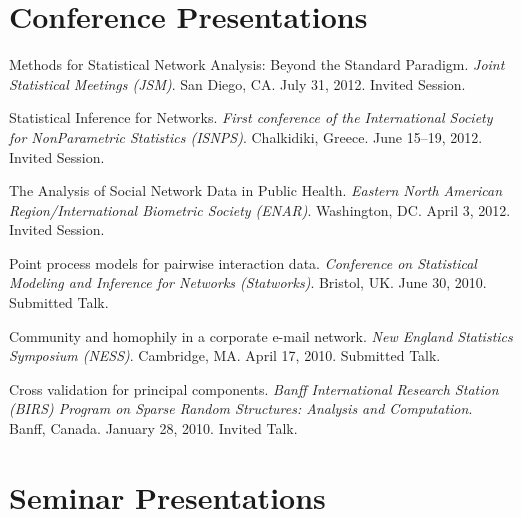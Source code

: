 \documentclass[10pt,letterpaper]{article}
\renewenvironment{itemize}{
  \begin{list}{}{
    \setlength{\leftmargin}{1.5em}
    \setlength{\itemsep}{0.25em}
    \setlength{\parskip}{0pt}
    \setlength{\parsep}{0.25em}
  }
}{
  \end{list}
}
\begin{document}
\section*{Conference Presentations}
\begin{itemize}
\item Methods for Statistical Network Analysis: Beyond the Standard Paradigm.
  \textit{Joint Statistical Meetings (JSM)}.
  San Diego, CA.
  July 31, 2012.
  Invited Session.

\item Statistical Inference for Networks. 
  \textit{First conference of the International Society for NonParametric Statistics (ISNPS)}.
  Chalkidiki, Greece.
  June 15--19, 2012.
  Invited Session.

\item The Analysis of Social Network Data in Public Health.
  \textit{Eastern North American Region/International Biometric Society (ENAR)}.
  Washington, DC.
  April 3, 2012.
  Invited Session.

\item Point process models for pairwise interaction data.
  \textit{Conference on Statistical Modeling and Inference for Networks (Statworks)}.
  Bristol, UK.
  June 30, 2010.
  Submitted Talk.

\item Community and homophily in a corporate e-mail network.
  \textit{New England Statistics Symposium (NESS)}.
  Cambridge, MA.
  April 17, 2010.
  Submitted Talk.

\item Cross validation for principal components.
  \textit{Banff International Research Station (BIRS) Program on Sparse Random Structures: Analysis and Computation}.
  Banff, Canada.
  January 28, 2010.
  Invited Talk.
\end{itemize}


\section*{Seminar Presentations}
\end{document}
